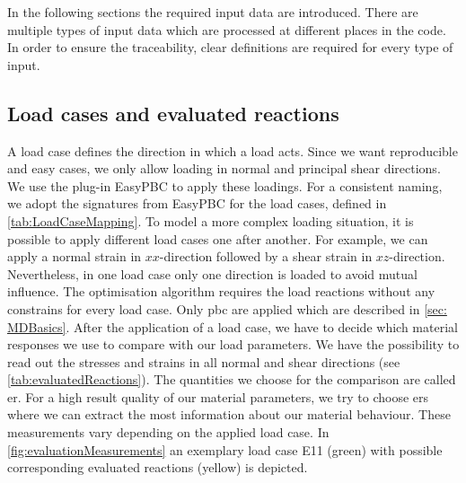


In the following sections the required input data are introduced. There are multiple types of input data which are processed at different places in the code. In order to ensure the traceability, clear definitions are required for every type of input. 

\subsection{Load cases and evaluated reactions}\label{subsec: loadCases}

A load case defines the direction in which a load acts. Since we want reproducible and easy cases, we only allow loading in normal and principal shear directions. We use the  plug-in EasyPBC to apply these loadings. For a consistent naming, we adopt the signatures from EasyPBC for the load cases, defined in \autoref{tab:LoadCaseMapping}.
To model a more complex loading situation, it is possible to apply different load cases one after another. For example, we can apply a normal strain in $xx$-direction followed by a shear strain in $xz$-direction. Nevertheless, in one load case only one direction is loaded to avoid mutual influence. The optimisation algorithm requires the load reactions without any constrains for every load case. Only \acrshort{pbc} are applied which are described in \autoref{sec: MDBasics}. After the application of a load case, we have to decide which material responses we use to compare with our load parameters. We have the possibility to read out the stresses and strains in all normal and shear directions (see \autoref{tab:evaluatedReactions}). The quantities we choose for the comparison are called \acrlong{er}.
For a high result quality of our material parameters, we try to choose \acrlong{er}s where we can extract the most information about our material behaviour. These measurements vary depending on the applied load case. In \autoref{fig:evaluationMeasurements} an exemplary load case E11 (green) with possible corresponding evaluated reactions (yellow) is depicted.


